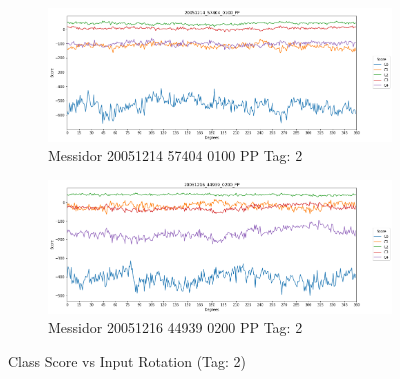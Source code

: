 \begin{figure}[ht!]
	\begin{subfigure}[b]{ 0.85\textwidth}
		\centering
		\includegraphics[width=\textwidth]{Figures/chapter_stability/20051214_57404_0100_PP/r/scores.png}
		\caption{Messidor 20051214 57404 0100 PP Tag: 2}		
	\end{subfigure}	
	\begin{subfigure}[b]{ 0.85\textwidth}
		\centering
		\includegraphics[width=\textwidth]{Figures/chapter_stability/20051216_44939_0200_PP/r/scores.png}
		\caption{Messidor 20051216 44939 0200 PP Tag: 2}		
	\end{subfigure}
	\hfill 
	\caption[Score vs Rotation (Tag: 2)]{Class Score vs Input Rotation (Tag: 2)}  
	\label{sta:fig:rot2} 
\end{figure}


